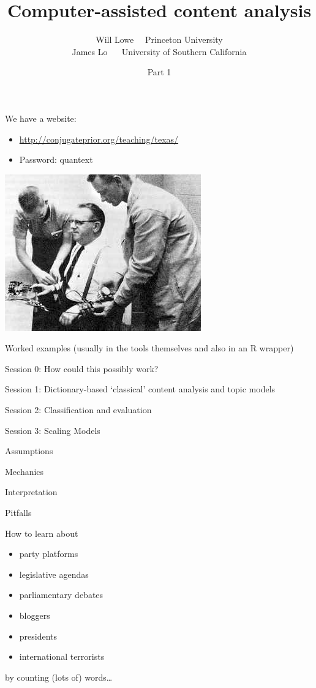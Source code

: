 \documentclass[11pt,compress,professionalfonts]{beamer}
\title{Computer-assisted content analysis}
\author{Will Lowe ~~Princeton University\\James Lo ~~ University of Southern California}
\date{Part 1}
\newcommand{\ita}{\begin{itemize}}
\newcommand{\itm}{\item[]}
\newcommand{\itz}{\end{itemize}}
\begin{document}
\maketitle




We have a website:
\ita
\itm \url{http://conjugateprior.org/teaching/texas/}
\itm Password: quantext
\itz


\centerline{\includegraphics[scale=0.25]{pictures/milgram-subject}}

Worked examples (usually in the tools themselves and also in an R wrapper) 


Session 0: How could this possibly work?

Session 1: Dictionary-based `classical' content analysis and topic models

Session 2: Classification and evaluation

Session 3: Scaling Models



Assumptions

Mechanics

Interpretation

Pitfalls


%

\newpage

How to learn about
\ita
\itm party platforms
\itm legislative agendas
\itm parliamentary debates
\itm bloggers
\itm presidents
\itm international terrorists
\itz
by counting (lots of) words\ldots
\end{document}
